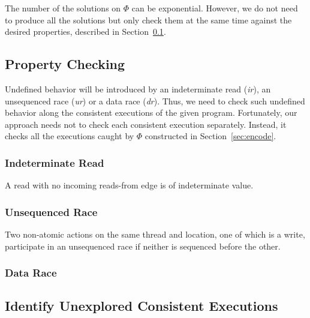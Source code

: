 \documentclass[preprint, numbers, 10pt]{sigplanconf}
\begin{document}
The number of the solutions on $\Phi$ can be exponential. However, we do not need to
produce all the solutions but only check them at the same time against the desired properties,
described in Section~\ref{sec:check}. 

\subsection{Property Checking}
\label{sec:check}

Undefined behavior will be introduced by an indeterminate read (\textit{ir}), 
an unsequenced race (\textit{ur}) or a data race (\textit{dr}). Thus, 
we need to check such undefined behavior along the consistent executions
of the given program. Fortunately, our approach needs not to check each
consistent execution separately. Instead, it checks all the executions caught
by $\Phi$ constructed in Section~\ref{sec:encode}. 

\subsubsection{Indeterminate Read}

A read with no incoming reads-from edge is of indeterminate value. 

\subsubsection{Unsequenced Race}

Two non-atomic actions on the same thread and location, one of which is 
a write, participate in an unsequenced race if neither is sequenced before the other.

\subsubsection{Data Race}

\subsection{Identify Unexplored Consistent Executions}
\label{sec:identify}
\end{document}

